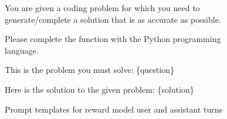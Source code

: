 
\begin{figure}[ht!]
  \centering

  \begin{tcolorbox}[title={Reward Model User Prompt}, colback=red!0, left=2pt,right=2pt,top=2pt,bottom=2pt]

  { %
You are given a coding problem for which you need to generate/complete a solution that is as accurate as possible.
\vspace{0.3cm}

Please complete the function with the Python programming language. 

\vspace{0.3cm}
This is the problem you must solve: \{question\}

  }
  \end{tcolorbox}

  \vspace{0.1in}
  \begin{tcolorbox}[title={Reward Model Assistant Prompt}, colback=blue!0, left=2pt,right=2pt,top=2pt,bottom=2pt]

  { %
Here is the solution to the given problem: \{solution\}
  }
  \end{tcolorbox}

  \caption{Prompt templates for reward model user and assistant turns}
  \label{fig:reward_model_prompt}

\end{figure}

